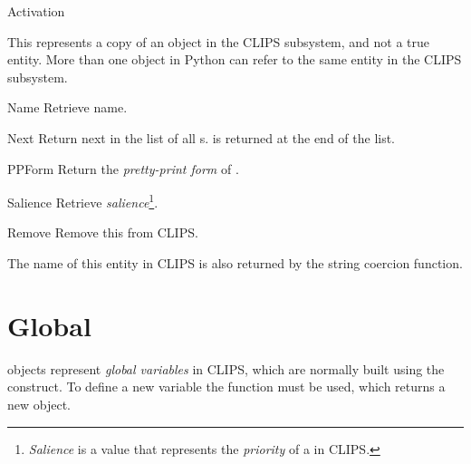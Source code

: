 \begin{classdesc*}{Activation}

This represents a copy of an  object in the CLIPS
subsystem, and not a true  entity. More than one
 object in Python can refer to the same
 entity in the CLIPS subsystem.


\begin{memberdesc}[property]{Name}
Retrieve  name.
\end{memberdesc}

\begin{methoddesc}{Next}{}
Return next  in the list of all s.
 is returned at the end of the list.
\end{methoddesc}

\begin{methoddesc}{PPForm}{}
Return the \emph{pretty-print form} of .
\end{methoddesc}

\begin{memberdesc}[property]{Salience}
Retrieve  \emph{salience}\footnote{\emph{Salience} is
a value that represents the \emph{priority} of a  in CLIPS.}.
\end{memberdesc}

\begin{methoddesc}{Remove}{}
Remove this  from CLIPS.
\end{methoddesc}

The name of this entity in CLIPS is also returned by the string coercion
function.

\end{classdesc*}



\section{Global\label{pyclips-cl-Global}}

 objects represent \emph{global variables} in CLIPS, which
are normally built using the  construct. To define a new
 variable the  function must be
used, which returns a new object.

